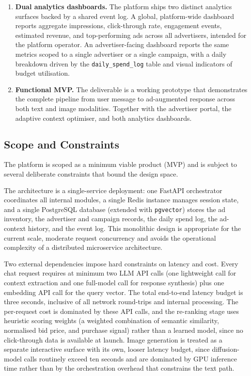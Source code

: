 \begin{enumerate}[label=(\roman*), leftmargin=2.5em]
  \item \textbf{Dual analytics dashboards.} The platform ships two distinct
    analytics surfaces backed by a shared event log. A global, platform-wide
    dashboard reports aggregate impressions, click-through rate, engagement
    events, estimated revenue, and top-performing ads across all advertisers,
    intended for the platform operator. An advertiser-facing dashboard
    reports the same metrics scoped to a single advertiser or a single
    campaign, with a daily breakdown driven by the \texttt{daily\_spend\_log}
    table and visual indicators of budget utilisation.

  \item \textbf{Functional MVP.} The deliverable is a working prototype that
    demonstrates the complete pipeline from user message to ad-augmented
    response across both text and image modalities. Together with the
    advertiser portal, the adaptive context optimiser, and both analytics
    dashboards.
\end{enumerate}

\subsection{Scope and Constraints}
\label{subsec:scope}

The platform is scoped as a minimum viable product (MVP) and is subject to
several deliberate constraints that bound the design space.

The architecture is a single-service deployment: one FastAPI orchestrator
coordinates all internal modules, a single Redis instance manages session state,
and a single PostgreSQL database (extended with \texttt{pgvector}) stores the
ad inventory, the advertiser and campaign records, the daily spend log, the
ad-context history, and the event log. This monolithic design is appropriate
for the current scale, moderate request
concurrency and avoids the operational complexity of a distributed
microservice architecture.

Two external dependencies impose hard constraints on latency and cost. Every
chat request requires at minimum two LLM API calls (one lightweight call for
context extraction and one full-model call for response synthesis) plus one
embedding API call for the query vector. The total end-to-end latency budget
is three seconds, inclusive of all network round-trips and internal
processing. The per-request cost is dominated by these API calls, and the
re-ranking stage uses heuristic scoring weights (a weighted combination of
semantic similarity, normalised bid price, and purchase signal) rather than a
learned model, since no click-through data is available at launch. Image
generation is treated as a separate interactive surface with its own, looser
latency budget, since diffusion-model calls routinely exceed ten seconds and
are dominated by GPU inference time rather than by the orchestration overhead
that constrains the text path.


